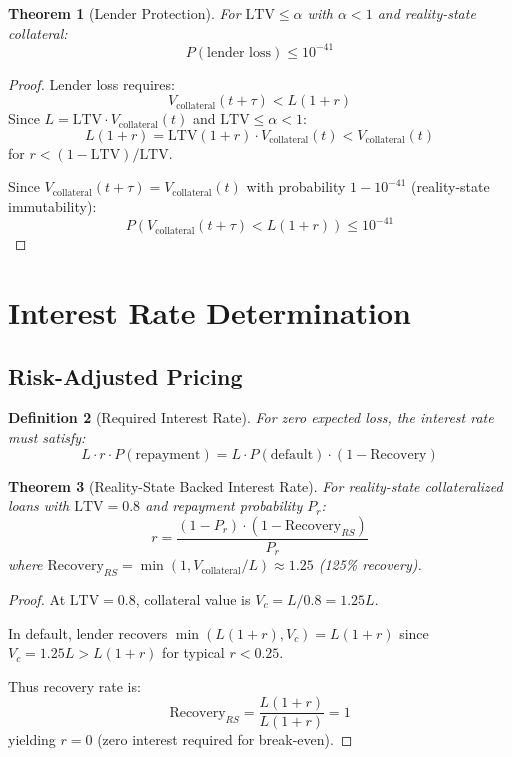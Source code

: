 \documentclass[12pt]{article}
\newtheorem{theorem}{Theorem}
\newtheorem{definition}[theorem]{Definition}
\begin{document}
\begin{theorem}[Lender Protection]
For $\text{LTV} \leq \alpha$ with $\alpha < 1$ and reality-state collateral:
$$
P(\text{lender loss}) \leq 10^{-41}
$$
\end{theorem}

\begin{proof}
Lender loss requires:
$$
V_{\text{collateral}}(t+\tau) < L(1+r)
$$
Since $L = \text{LTV} \cdot V_{\text{collateral}}(t)$ and $\text{LTV} \leq \alpha < 1$:
$$
L(1+r) = \text{LTV}(1+r) \cdot V_{\text{collateral}}(t) < V_{\text{collateral}}(t)
$$
for $r < (1-\text{LTV})/\text{LTV}$.

Since $V_{\text{collateral}}(t+\tau) = V_{\text{collateral}}(t)$ with probability $1-10^{-41}$ (reality-state immutability):
$$
P(V_{\text{collateral}}(t+\tau) < L(1+r)) \leq 10^{-41}
$$
\end{proof}

\section{Interest Rate Determination}

\subsection{Risk-Adjusted Pricing}

\begin{definition}[Required Interest Rate]
For zero expected loss, the interest rate must satisfy:
$$
L \cdot r \cdot P(\text{repayment}) = L \cdot P(\text{default}) \cdot (1 - \text{Recovery})
$$
\end{definition}

\begin{theorem}[Reality-State Backed Interest Rate]
For reality-state collateralized loans with $\text{LTV} = 0.8$ and repayment probability $P_r$:
$$
r = \frac{(1-P_r) \cdot (1-\text{Recovery}_{RS})}{P_r}
$$
where $\text{Recovery}_{RS} = \min(1, V_{\text{collateral}}/L) \approx 1.25$ (125\% recovery).
\end{theorem}

\begin{proof}
At $\text{LTV} = 0.8$, collateral value is $V_c = L/0.8 = 1.25L$.

In default, lender recovers $\min(L(1+r), V_c) = L(1+r)$ since $V_c = 1.25L > L(1+r)$ for typical $r < 0.25$.

Thus recovery rate is:
$$
\text{Recovery}_{RS} = \frac{L(1+r)}{L(1+r)} = 1
$$
yielding $r = 0$ (zero interest required for break-even).
\end{proof}
\end{document}
